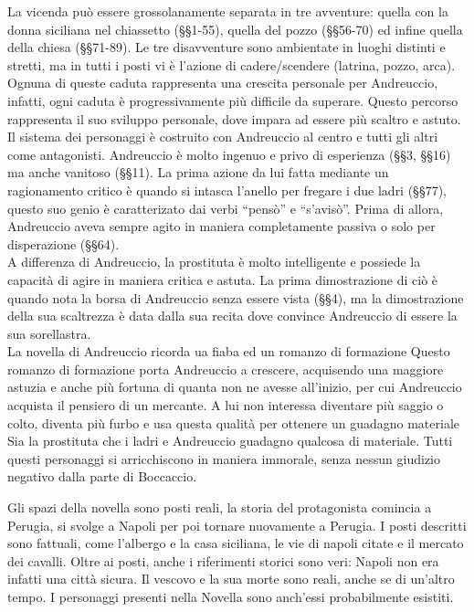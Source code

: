 \documentclass[a4paper]{article}
\newcommand{\quotes}[1]{``#1''}
\begin{document}
La vicenda può essere grossolanamente separata in tre avventure:
quella con la donna siciliana nel chiassetto (§§1-55), quella del pozzo (§§56-70)
ed infine quella della chiesa (§§71-89).
Le tre disavventure sono ambientate in luoghi distinti e stretti,
ma in tutti i posti vi è l'azione di cadere/scendere (latrina, pozzo, arca).
Ognuna di queste caduta rappresenta una crescita personale per Andreuccio, infatti,
ogni caduta è progressivamente più difficile da superare. Questo percorso rappresenta il suo
sviluppo personale, dove impara ad essere più scaltro e astuto.
Il sistema dei personaggi è costruito con Andreuccio al centro e tutti gli altri come antagonisti.
Andreuccio è molto ingenuo e privo di esperienza (§§3, §§16) ma anche vanitoso (§§11).
La prima azione da lui fatta mediante un ragionamento critico è quando si intasca l'anello per fregare i due ladri (§§77),
questo suo genio è caratterizato dai verbi \quotes{pensò} e \quotes{s'avisò}.
Prima di allora, Andreuccio aveva sempre agito in maniera completamente passiva o solo per disperazione (§§64).
\\
A differenza di Andreuccio, la prostituta è molto intelligente e possiede la capacità di agire in maniera critica e astuta.
La prima dimostrazione di ciò è quando nota la borsa di Andreuccio senza essere vista (§§4),
ma la dimostrazione della sua scaltrezza è data dalla sua recita dove convince Andreuccio di essere la sua sorellastra.
\\
La novella di Andreuccio ricorda ua fiaba ed un romanzo di formazione
Questo romanzo di formazione porta Andreuccio a crescere, acquisendo una maggiore astuzia e anche più fortuna di
quanta non ne avesse all'inizio, per cui Andreuccio acquista il pensiero di un mercante.
A lui non interessa diventare più saggio o colto, diventa più furbo e usa questa qualità per ottenere un guadagno materiale
Sia la prostituta che i ladri e Andreuccio guadagno qualcosa di materiale.
Tutti questi personaggi si arricchiscono in maniera immorale, senza nessun giudizio negativo dalla parte di Boccaccio.

Gli spazi della novella sono posti reali, la storia del protagonista comincia a Perugia,
si svolge a Napoli per poi tornare nuovamente a Perugia.
I posti descritti sono fattuali, come l'albergo e la casa siciliana, le vie di napoli citate
e il mercato dei cavalli.
Oltre ai posti, anche i riferimenti storici sono veri: Napoli non era infatti una città sicura.
Il vescovo e la sua morte sono reali, anche se di un'altro tempo. I personaggi presenti nella Novella
sono anch'essi probabilmente esistiti.
\end{document}
